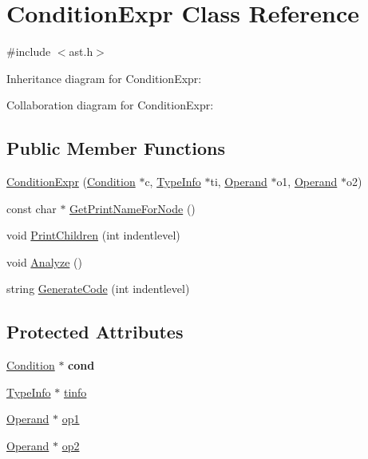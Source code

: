 \hypertarget{class_condition_expr}{}\section{Condition\+Expr Class Reference}
\label{class_condition_expr}


{\ttfamily \#include $<$ast.\+h$>$}



Inheritance diagram for Condition\+Expr\+:


Collaboration diagram for Condition\+Expr\+:
\subsection*{Public Member Functions}
\begin{DoxyCompactItemize}
\item 
\hyperlink{class_condition_expr_ac7cace7107099f6cd54cb5e1ba0f61f6}{Condition\+Expr} (\hyperlink{class_condition}{Condition} $\ast$c, \hyperlink{class_type_info}{Type\+Info} $\ast$ti, \hyperlink{class_operand}{Operand} $\ast$o1, \hyperlink{class_operand}{Operand} $\ast$o2)
\item 
const char $\ast$ \hyperlink{class_condition_expr_a557c885f6f859e0d3757ef7e50170896}{Get\+Print\+Name\+For\+Node} ()
\item 
void \hyperlink{class_condition_expr_a6153d3269f792a6910b2a3f8ea79f406}{Print\+Children} (int indentlevel)
\item 
void \hyperlink{class_condition_expr_a6bad5562b63bd649a1ed921e43de0dca}{Analyze} ()
\item 
string \hyperlink{class_condition_expr_aaf08642ee65c2cb3a566a3bfac14e3a4}{Generate\+Code} (int indentlevel)
\end{DoxyCompactItemize}
\subsection*{Protected Attributes}
\begin{DoxyCompactItemize}
\item 
\mbox{\label{class_condition_expr_ad601418da6e2fa766645549dfa408296}} 
\hyperlink{class_condition}{Condition} $\ast$ {\bfseries cond}
\item 
\hyperlink{class_type_info}{Type\+Info} $\ast$ \hyperlink{class_condition_expr_a17d3426b183c1493c9301152f94d28ba}{tinfo}
\item 
\hyperlink{class_operand}{Operand} $\ast$ \hyperlink{class_condition_expr_a04ae325c80ddf36a19ac98835f1ec2f5}{op1}
\item 
\hyperlink{class_operand}{Operand} $\ast$ \hyperlink{class_condition_expr_ad5729c5eb933845c2833be6a8da09e8a}{op2}
\end{DoxyCompactItemize}


